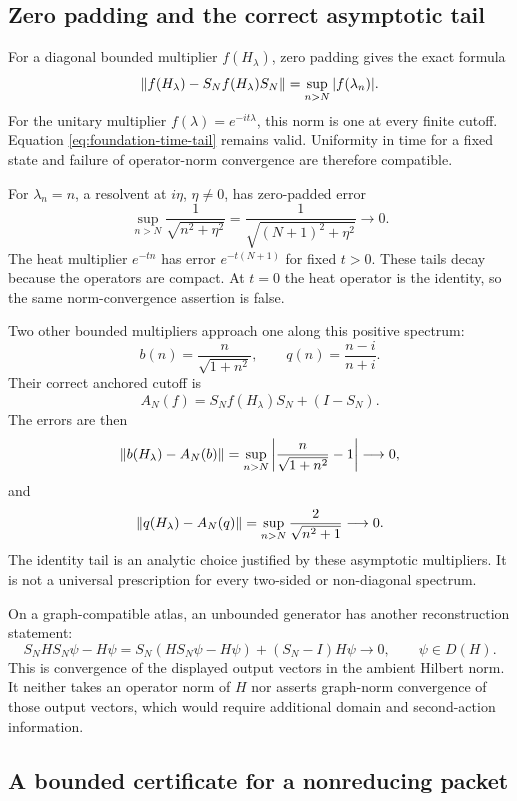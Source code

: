 \subsection{Zero padding and the correct asymptotic tail}

For a diagonal bounded multiplier $f(H_\lambda)$, zero padding gives the exact formula
\[
 \left\lVert f(H_\lambda)-S_Nf(H_\lambda)S_N\right\rVert
 =\sup_{n>N}|f(\lambda_n)|.
\]
For the unitary multiplier $f(\lambda)=e^{-it\lambda}$, this norm is one at every finite cutoff. Equation \eqref{eq:foundation-time-tail} remains valid. Uniformity in time for a fixed state and failure of operator-norm convergence are therefore compatible.

For $\lambda_n=n$, a resolvent at $i\eta$, $\eta\ne0$, has zero-padded error
\[
 \sup_{n>N}\frac1{\sqrt{n^2+\eta^2}}
 =\frac1{\sqrt{(N+1)^2+\eta^2}}\longrightarrow0.
\]
The heat multiplier $e^{-tn}$ has error $e^{-t(N+1)}$ for fixed $t>0$. These tails decay because the operators are compact. At $t=0$ the heat operator is the identity, so the same norm-convergence assertion is false.

Two other bounded multipliers approach one along this positive spectrum:
\[
 b(n)=\frac{n}{\sqrt{1+n^2}},\qquad
 q(n)=\frac{n-i}{n+i}.
\]
Their correct anchored cutoff is
\[
 A_N(f)=S_Nf(H_\lambda)S_N+(I-S_N).
\]
The errors are then
\[
 \left\lVert b(H_\lambda)-A_N(b)\right\rVert
 =\sup_{n>N}\left|\frac{n}{\sqrt{1+n^2}}-1\right|\longrightarrow0,
\]
and
\[
 \left\lVert q(H_\lambda)-A_N(q)\right\rVert
 =\sup_{n>N}\frac2{\sqrt{n^2+1}}\longrightarrow0.
\]
The identity tail is an analytic choice justified by these asymptotic multipliers. It is not a universal prescription for every two-sided or non-diagonal spectrum.

On a graph-compatible atlas, an unbounded generator has another reconstruction statement:
\[
 S_NHS_N\psi-H\psi
 =S_N(HS_N\psi-H\psi)+(S_N-I)H\psi\longrightarrow0,
 \qquad\psi\in D(H).
\]
This is convergence of the displayed output vectors in the ambient Hilbert norm. It neither takes an operator norm of $H$ nor asserts graph-norm convergence of those output vectors, which would require additional domain and second-action information.


\subsection{A bounded certificate for a nonreducing packet}

